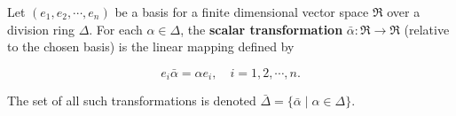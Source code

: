 Let $(e_1, e_2, \cdots, e_n)$ be a basis for a finite dimensional vector space $\mathfrak{R}$ over a division ring $\Delta$. For each $\alpha \in \Delta$, the \textbf{scalar transformation} $\bar{\alpha}: \mathfrak{R} \to \mathfrak{R}$ (relative to the chosen basis) is the linear mapping defined by

$$e_i \bar{\alpha} = \alpha e_i, \quad i = 1, 2, \cdots, n.$$

The set of all such transformations is denoted $\bar{\Delta} = \{\bar{\alpha} \mid \alpha \in \Delta\}$.
